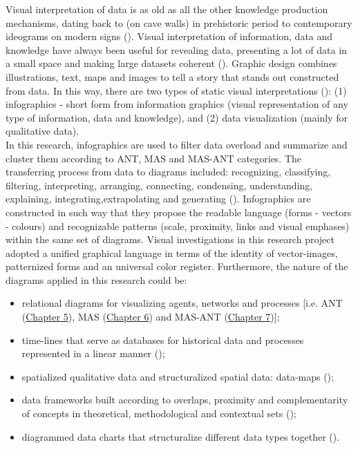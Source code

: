 \documentclass[11pt]{report}
\begin{document}
{{{{Visual interpretation of data is as old as all the other knowledge production mechanisms, dating back to (on cave walls) in prehistoric period to contemporary ideograms on modern signs (\href{Krum}{\citealt{krum_cool_2013}}).
Visual interpretation of information, data and knowledge have always been useful for revealing data, presenting a lot of data in a small space and making large datasets coherent (\href{Tufte}{\citealt{tufte_visual_2001}}).
Graphic design combines illustrations, text, maps and images to tell a story that stands out constructed from data. 
In this way, there are two types of static visual interpretations (\href{Krum}{\citealt{krum_cool_2013}}):
(1) infographics - short form from information graphics (visual representation of any type of information, data and knowledge), and
(2) data visualization (mainly for qualitative data).
\\

In this research, infographics are used to filter data overload and summarize and cluster them according to ANT, MAS and MAS-ANT categories.
The transferring process from data to diagrams included: recognizing, classifying, filtering, interpreting, arranging, connecting, condensing, understanding, explaining, integrating,extrapolating and generating (\href{McCandless}{\citealt{mccandless_knowledge_2014}}).
Infographics are constructed in such way that they propose the readable  language (forms - vectors - colours) and recognizable patterns (scale, proximity, links and visual emphases) within the same set of diagrams.
Visual investigations in this research project adopted a unified graphical language in terms of the identity of vector-images, patternized forms and an universal color register.
Furthermore, the nature of the diagrams applied in this research could be:
\begin{itemize}
\item relational diagrams for visualizing agents, networks and processes [i.e. ANT (\href{Chapter 5}{Chapter 5}), MAS (\href{Chapter 6}{Chapter 6}) and MAS-ANT (\href{Chapter 7}{Chapter 7})];
\item time-lines that serve as databases for historical data and processes represented in a linear manner (\href{Rosenberg}{\citealt{rosenberg_cartographies_2012}});
\item spatialized qualitative data and structuralized spatial data: data-maps (\href{Raisson}{\citealt{raisson_2033_2010}});
\item data frameworks built according to overlaps, proximity and complementarity of concepts in theoretical, methodological and contextual sets (\href{Caraes}{\citealt{caraes_images_2011}});
\item diagrammed data charts that structuralize different data types together (\href{Yau}{\citealt{yau_visualize_2013}}).
\end{itemize}

}}}}
\end{document}
